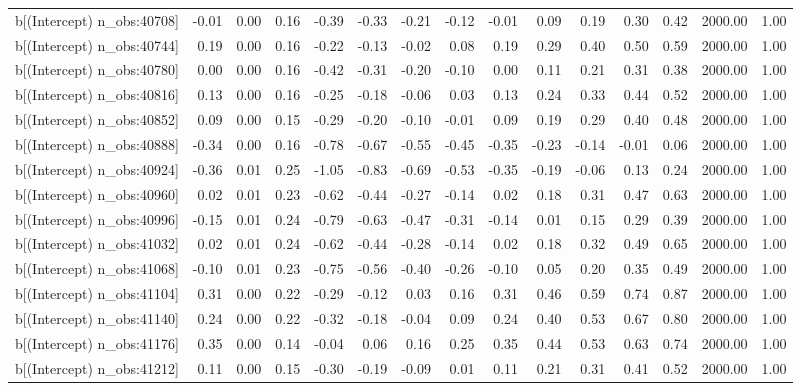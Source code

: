 \begin{table}[ht]
\begin{tabular}{rrrrrrrrrrrrrrr}
  b[(Intercept) n\_obs:40708] & -0.01 & 0.00 & 0.16 & -0.39 & -0.33 & -0.21 & -0.12 & -0.01 & 0.09 & 0.19 & 0.30 & 0.42 & 2000.00 & 1.00 \\ 
  b[(Intercept) n\_obs:40744] & 0.19 & 0.00 & 0.16 & -0.22 & -0.13 & -0.02 & 0.08 & 0.19 & 0.29 & 0.40 & 0.50 & 0.59 & 2000.00 & 1.00 \\ 
  b[(Intercept) n\_obs:40780] & 0.00 & 0.00 & 0.16 & -0.42 & -0.31 & -0.20 & -0.10 & 0.00 & 0.11 & 0.21 & 0.31 & 0.38 & 2000.00 & 1.00 \\ 
  b[(Intercept) n\_obs:40816] & 0.13 & 0.00 & 0.16 & -0.25 & -0.18 & -0.06 & 0.03 & 0.13 & 0.24 & 0.33 & 0.44 & 0.52 & 2000.00 & 1.00 \\ 
  b[(Intercept) n\_obs:40852] & 0.09 & 0.00 & 0.15 & -0.29 & -0.20 & -0.10 & -0.01 & 0.09 & 0.19 & 0.29 & 0.40 & 0.48 & 2000.00 & 1.00 \\ 
  b[(Intercept) n\_obs:40888] & -0.34 & 0.00 & 0.16 & -0.78 & -0.67 & -0.55 & -0.45 & -0.35 & -0.23 & -0.14 & -0.01 & 0.06 & 2000.00 & 1.00 \\ 
  b[(Intercept) n\_obs:40924] & -0.36 & 0.01 & 0.25 & -1.05 & -0.83 & -0.69 & -0.53 & -0.35 & -0.19 & -0.06 & 0.13 & 0.24 & 2000.00 & 1.00 \\ 
  b[(Intercept) n\_obs:40960] & 0.02 & 0.01 & 0.23 & -0.62 & -0.44 & -0.27 & -0.14 & 0.02 & 0.18 & 0.31 & 0.47 & 0.63 & 2000.00 & 1.00 \\ 
  b[(Intercept) n\_obs:40996] & -0.15 & 0.01 & 0.24 & -0.79 & -0.63 & -0.47 & -0.31 & -0.14 & 0.01 & 0.15 & 0.29 & 0.39 & 2000.00 & 1.00 \\ 
  b[(Intercept) n\_obs:41032] & 0.02 & 0.01 & 0.24 & -0.62 & -0.44 & -0.28 & -0.14 & 0.02 & 0.18 & 0.32 & 0.49 & 0.65 & 2000.00 & 1.00 \\ 
  b[(Intercept) n\_obs:41068] & -0.10 & 0.01 & 0.23 & -0.75 & -0.56 & -0.40 & -0.26 & -0.10 & 0.05 & 0.20 & 0.35 & 0.49 & 2000.00 & 1.00 \\ 
  b[(Intercept) n\_obs:41104] & 0.31 & 0.00 & 0.22 & -0.29 & -0.12 & 0.03 & 0.16 & 0.31 & 0.46 & 0.59 & 0.74 & 0.87 & 2000.00 & 1.00 \\ 
  b[(Intercept) n\_obs:41140] & 0.24 & 0.00 & 0.22 & -0.32 & -0.18 & -0.04 & 0.09 & 0.24 & 0.40 & 0.53 & 0.67 & 0.80 & 2000.00 & 1.00 \\ 
  b[(Intercept) n\_obs:41176] & 0.35 & 0.00 & 0.14 & -0.04 & 0.06 & 0.16 & 0.25 & 0.35 & 0.44 & 0.53 & 0.63 & 0.74 & 2000.00 & 1.00 \\ 
  b[(Intercept) n\_obs:41212] & 0.11 & 0.00 & 0.15 & -0.30 & -0.19 & -0.09 & 0.01 & 0.11 & 0.21 & 0.31 & 0.41 & 0.52 & 2000.00 & 1.00 \\ 

\end{tabular}
\end{table}
